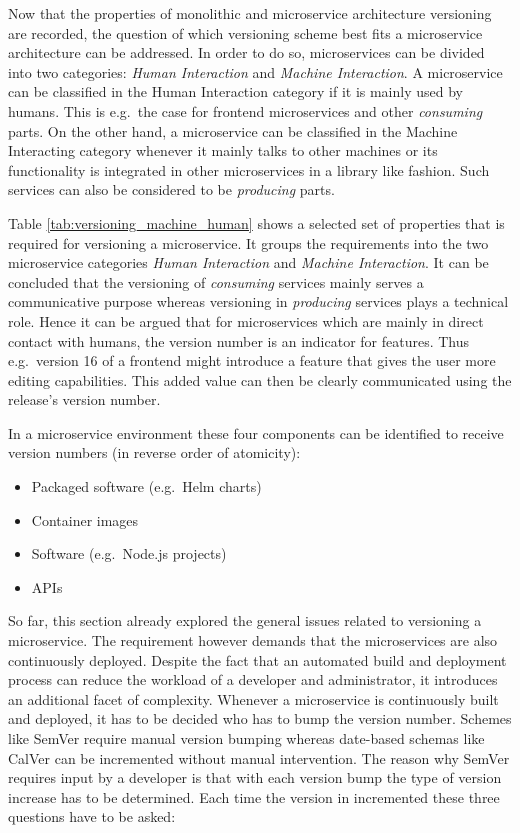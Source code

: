 Now that the properties of monolithic and microservice architecture versioning
are recorded, the question of which versioning scheme best fits a microservice
architecture can be addressed. In order to do so, microservices can be divided
into two categories: \textit{Human Interaction} and \textit{Machine
Interaction}. A microservice can be classified in the Human Interaction
category if it is mainly used by humans. This is e.g.\ the case for frontend
microservices and other \textit{consuming} parts. On the other hand, a
microservice can be classified in the Machine Interacting category whenever it
mainly talks to other machines or its functionality is integrated in other
microservices in a library like fashion. Such services can also be considered
to be \textit{producing} parts.



Table \ref{tab:versioning_machine_human} shows a selected set of properties
that is required for versioning a microservice. It groups the requirements into
the two microservice categories \textit{Human Interaction} and \textit{Machine
Interaction}. It can be concluded that the versioning of \textit{consuming}
services mainly serves a communicative purpose whereas versioning in
\textit{producing} services plays a technical role. Hence it can be argued that
for microservices which are mainly in direct contact with humans, the version
number is an indicator for features. Thus e.g.\ version 16 of a frontend might
introduce a feature that gives the user more editing capabilities. This added
value can then be clearly communicated using the release's version number.

In a microservice environment these four components can be identified to
receive version numbers (in reverse order of atomicity):

\begin{itemize}
  \item Packaged software (e.g.\ Helm charts)
  \item Container images
  \item Software (e.g.\ Node.js projects)
  \item \acp{API}
\end{itemize}

So far, this section already explored the general issues related to versioning
a microservice. The requirement however demands that the microservices are also
continuously deployed. Despite the fact that an automated build and deployment
process can reduce the workload of a developer and administrator, it introduces
an additional facet of complexity. Whenever a microservice is continuously
built and deployed, it has to be decided who has to bump the version number.
Schemes like SemVer require manual version bumping whereas date-based schemas
like CalVer can be incremented without manual intervention. The reason why
SemVer requires input by a developer is that with each version bump the type of
version increase has to be determined. Each time the version in incremented
these three questions have to be asked:

